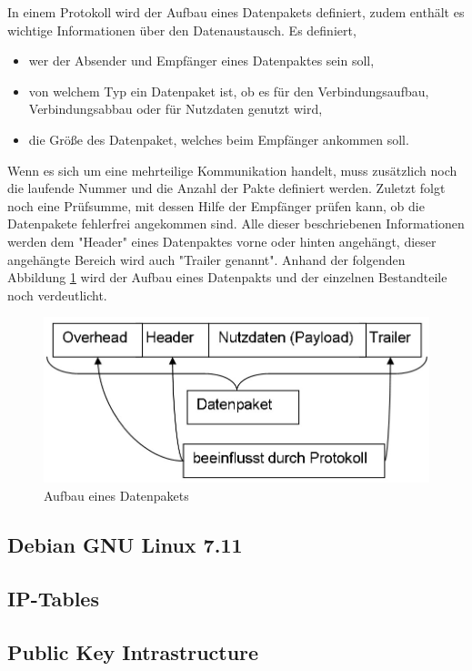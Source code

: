 \documentclass[
a4paper,     %
 headsepline, %
footsepline, %
titlepage,   %
 halfparskip,     %
 fleqn,       %
12pt         %
]{scrartcl}  %
\begin{document}
In einem Protokoll wird der Aufbau eines Datenpakets definiert, zudem enthält es wichtige Informationen über den Datenaustausch. 
Es definiert, 
\begin{itemize}
\item wer der Absender und Empfänger eines Datenpaktes sein soll,
\item von welchem Typ ein Datenpaket ist, ob es für den Verbindungsaufbau, Verbindungsabbau oder für Nutzdaten genutzt wird, 
\item die Größe des Datenpaket, welches beim Empfänger ankommen soll. 
\end{itemize}
Wenn es sich um eine mehrteilige Kommunikation handelt, muss zusätzlich noch die laufende Nummer und die Anzahl der Pakte definiert werden. Zuletzt folgt noch eine Prüfsumme, mit dessen Hilfe der Empfänger prüfen kann, ob die Datenpakete fehlerfrei angekommen sind. 
Alle dieser beschriebenen Informationen werden dem "Header" eines Datenpaktes vorne oder hinten angehängt, dieser angehängte Bereich wird auch "Trailer genannt". Anhand der folgenden Abbildung \ref{fig:datenpaket} wird der Aufbau eines Datenpakts und der einzelnen Bestandteile noch verdeutlicht. 
\begin{figure}[!h]
	\includegraphics[width=\textwidth]{pictures/datenpaket.png}
	\caption{Aufbau eines Datenpakets \cite{Header-Dat}}
	\label{fig:datenpaket}
\end{figure}

\subsection{Debian GNU Linux 7.11}\label{Linux}
\subsection{IP-Tables}\label{iptables}
\subsection{Public Key Intrastructure}\label{PKI}
\end{document}
